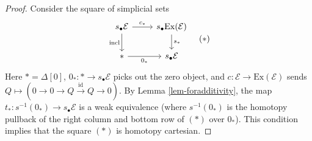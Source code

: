 \documentclass[12pt]{report}
\numberwithin{equation}{section}
\begin{document}
\begin{proof}
	Consider the square of simplicial sets
	\[
	\begin{tikzcd}
		{s_{\bullet}\mathcal{E}} & {s_{\bullet}\mathrm{Ex}(\mathcal{E})} \\
		\ast & {s_{\bullet}\mathcal{E}}
		\arrow["{c_*}", from=1-1, to=1-2]
		\arrow["{\text{incl}}"', from=1-1, to=2-1]
		\arrow["{s_*}", from=1-2, to=2-2]
		\arrow["{0_*}"', from=2-1, to=2-2]
	\end{tikzcd}
	\quad (*)
	\]
	Here $\ast = \Delta[0]$, $0_*: \ast \to s_{\bullet}\mathcal{E}$ picks out the zero object, and $c: \mathcal{E} \to \mathrm{Ex}(\mathcal{E})$ sends $Q \mapsto (0 \to 0 \to Q \xrightarrow{\mathrm{id}} Q \to 0)$.
	By Lemma \ref{lem-foradditivity}, the map $t_*: s^{-1}(0_*) \to s_{\bullet}\mathcal{E}$ is a weak equivalence (where $s^{-1}(0_*)$ is the homotopy pullback of the right column and bottom row of $(*)$ over $0_*$). This condition implies that the square $(*)$ is homotopy cartesian.
	

\end{proof}
\end{document}
